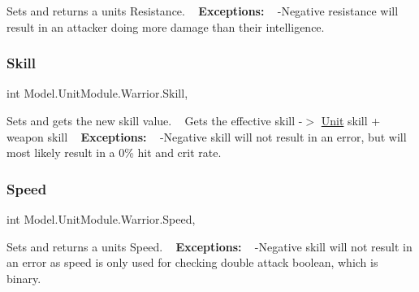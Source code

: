 Sets and returns a unit\textquotesingle{}s Resistance. ~\newline
 {\bfseries Exceptions\+:} ~\newline
 -\/\+Negative resistance will result in an attacker doing more damage than their intelligence. \hypertarget{class_model_1_1_unit_module_1_1_warrior_a4a3abc882f238c8e781b4cd61cdf7452}{}\label{class_model_1_1_unit_module_1_1_warrior_a4a3abc882f238c8e781b4cd61cdf7452} 
\subsubsection{\texorpdfstring{Skill}{Skill}}
{\footnotesize\ttfamily int Model.\+Unit\+Module.\+Warrior.\+Skill\hspace{0.3cm}{\ttfamily [get]}, {\ttfamily [set]}}

Sets and gets the new skill value. ~\newline
 Gets the effective skill -\/$>$ \hyperlink{interface_model_1_1_unit_module_1_1_unit}{Unit} skill + weapon skill ~\newline
 {\bfseries Exceptions\+:} ~\newline
 -\/\+Negative skill will not result in an error, but will most likely result in a 0\% hit and crit rate. \hypertarget{class_model_1_1_unit_module_1_1_warrior_a3ed930a9ff5f32dfd418d5e5a9744dd1}{}\label{class_model_1_1_unit_module_1_1_warrior_a3ed930a9ff5f32dfd418d5e5a9744dd1} 
\subsubsection{\texorpdfstring{Speed}{Speed}}
{\footnotesize\ttfamily int Model.\+Unit\+Module.\+Warrior.\+Speed\hspace{0.3cm}{\ttfamily [get]}, {\ttfamily [set]}}

Sets and returns a unit\textquotesingle{}s Speed. ~\newline
 {\bfseries Exceptions\+:} ~\newline
 -\/\+Negative skill will not result in an error as speed is only used for checking double attack boolean, which is binary. \hypertarget{class_model_1_1_unit_module_1_1_warrior_a61bcdb9427a17cd9bab664d8001b45a6}{}\label{class_model_1_1_unit_module_1_1_warrior_a61bcdb9427a17cd9bab664d8001b45a6} 
